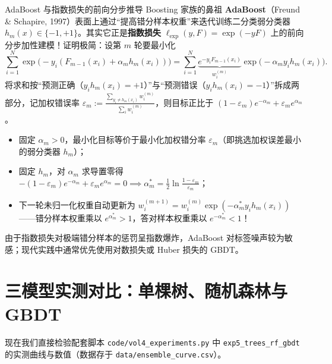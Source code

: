 \begin{extBox}{AdaBoost 与指数损失的前向分步推导}
Boosting 家族的鼻祖 \textbf{AdaBoost}（Freund \& Schapire, 1997）表面上通过“提高错分样本权重”来迭代训练二分类弱分类器 $h_m(x) \in \{-1, +1\}$。其实它正是\textbf{指数损失} $\ell_{\exp}(y, F) = \exp(-y F)$ 上的前向分步加性建模！证明极简：设第 $m$ 轮要最小化
\[
  \sum_{i=1}^{N} \exp\!\big(-y_i(F_{m-1}(x_i) + \alpha_m h_m(x_i))\big)
  = \sum_{i=1}^{N} \underbrace{e^{-y_i F_{m-1}(x_i)}}_{w_i^{(m)}} \exp\!\big(-\alpha_m y_i h_m(x_i)\big).
\]
将求和按“预测正确（$y_i h_m(x_i)=+1$）”与“预测错误（$y_i h_m(x_i)=-1$）”拆成两部分，记加权错误率 $\varepsilon_m := \frac{\sum_{y_i \neq h_m(x_i)} w_i^{(m)}}{\sum_i w_i^{(m)}}$，则目标正比于 $(1 - \varepsilon_m) e^{-\alpha_m} + \varepsilon_m e^{\alpha_m}$。
\begin{itemize}
  \item 固定 $\alpha_m > 0$，最小化目标等价于最小化加权错分率 $\varepsilon_m$（即挑选加权误差最小的弱分类器 $h_m$）；
  \item 固定 $h_m$，对 $\alpha_m$ 求导置零得 $-(1-\varepsilon_m)e^{-\alpha_m} + \varepsilon_m e^{\alpha_m} = 0 \implies \alpha_m^* = \frac{1}{2}\ln\frac{1-\varepsilon_m}{\varepsilon_m}$；
  \item 下一轮未归一化权重自动更新为 $w_i^{(m+1)} = w_i^{(m)}\exp(-\alpha_m^* y_i h_m(x_i))$——错分样本权重乘以 $e^{\alpha_m^*} > 1$，答对样本权重乘以 $e^{-\alpha_m^*} < 1$！
\end{itemize}
由于指数损失对极端错分样本的惩罚呈指数爆炸，AdaBoost 对标签噪声较为敏感；现代实践中通常优先使用对数损失或 Huber 损失的 GBDT。
\end{extBox}

\section{三模型实测对比：单棵树、随机森林与 GBDT}\label{sec:trees-exp}

现在我们直接检验配套脚本 \texttt{code/\allowbreak vol4\_experiments.py} 中 \texttt{exp5\_trees\_rf\_gbdt} 的实测曲线与数值（数据存于 \texttt{data/\allowbreak ensemble\_curve.csv}）。

